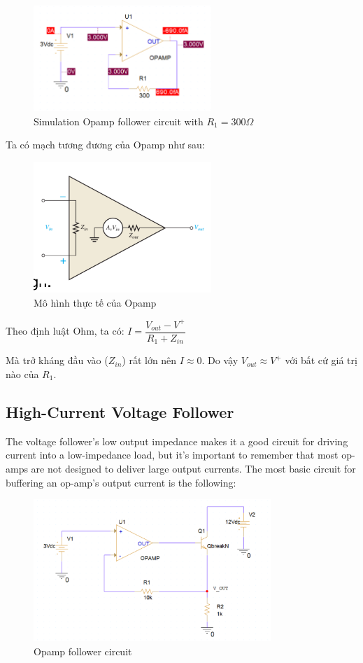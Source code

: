 \begin{figure}[ht]
    \centering
    \includegraphics[width=0.6\textwidth]{graphics/ex1/f3.png}
    \caption{Simulation Opamp follower circuit with $R_1 = 300 \Omega$}
\end{figure}

Ta có mạch tương đương của Opamp như sau:

\begin{figure}[ht]
    \centering
    \includegraphics[width=0.6\textwidth]{graphics/ex1/f4.png}
    \caption{Mô hình thực tế của Opamp}
\end{figure}

Theo định luật Ohm, ta có: $I = \dfrac{V_{out} - V^+}{R_1 + Z_{in}}$

Mà trở kháng đầu vào ($Z_{in}$) rất lớn nên $I \approx 0$. Do vậy $V_{out} \approx V^+$ với bất cứ giá trị nào của $R_1$.
\pagebreak
\subsection{High-Current Voltage Follower}
The voltage follower's low output impedance makes it a good circuit for driving current
into a low-impedance load, but it's important to remember that most op-amps are not
designed to deliver large output currents. The most basic circuit for buffering an op-amp's
output current is the following:

\begin{figure}[ht]
    \centering
    \includegraphics[width=0.8\textwidth]{graphics/ex1/f6.png}
    \caption{Opamp follower circuit}
\end{figure}

